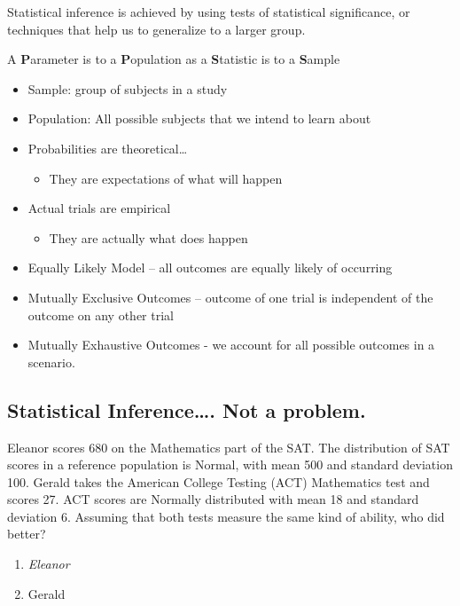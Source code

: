 \documentclass[]{article}
\begin{document}
Statistical inference is achieved by using tests of statistical
significance, or techniques that help us to generalize to a larger
group.

A \textbf{P}arameter is to a \textbf{P}opulation as a \textbf{S}tatistic
is to a \textbf{S}ample

\begin{itemize}
\itemsep1pt\parskip0pt
\item
  Sample: group of subjects in a study
\item
  Population: All possible subjects that we intend to learn about
\item
  Probabilities are theoretical\ldots{}

  \begin{itemize}
  \itemsep1pt\parskip0pt
  \item
    They are expectations of what will happen
  \end{itemize}
\item
  Actual trials are empirical

  \begin{itemize}
  \itemsep1pt\parskip0pt
  \item
    They are actually what does happen
  \end{itemize}
\item
  Equally Likely Model -- all outcomes are equally likely of occurring
\item
  Mutually Exclusive Outcomes -- outcome of one trial is independent of
  the outcome on any other trial
\item
  Mutually Exhaustive Outcomes - we account for all possible outcomes in
  a scenario.
\end{itemize}

\subsection{Statistical Inference\ldots{}. Not a
problem.}\label{statistical-inference.-not-a-problem.}

Eleanor scores 680 on the Mathematics part of the SAT. The distribution
of SAT scores in a reference population is Normal, with mean 500 and
standard deviation 100. Gerald takes the American College Testing (ACT)
Mathematics test and scores 27. ACT scores are Normally distributed with
mean 18 and standard deviation 6. Assuming that both tests measure the
same kind of ability, who did better?

\begin{enumerate}
\def\labelenumi{\arabic{enumi}.}
\itemsep1pt\parskip0pt
\item
  \emph{Eleanor}
\item
  Gerald
\end{enumerate}
\end{document}

